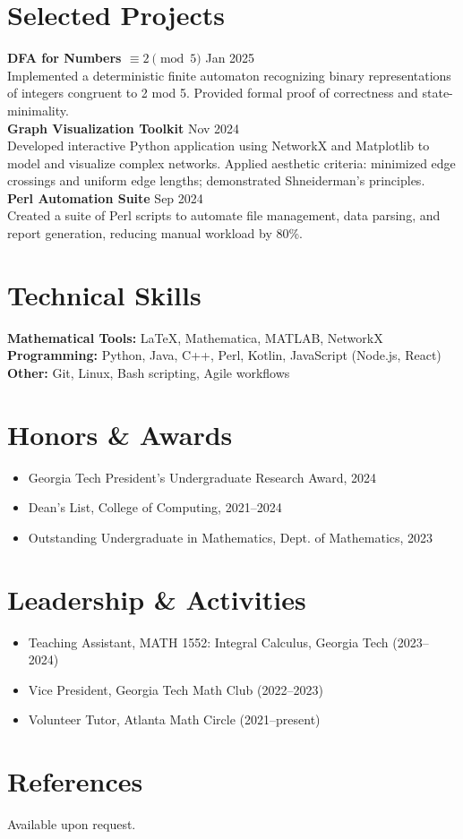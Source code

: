 \section*{Selected Projects}
\noindent
\textbf{DFA for Numbers $\equiv 2 \pmod{5}$} \hfill Jan 2025\\
Implemented a deterministic finite automaton recognizing binary representations of integers congruent to 2 mod 5. Provided formal proof of correctness and state-minimality.\\

\noindent
\textbf{Graph Visualization Toolkit} \hfill Nov 2024\\
Developed interactive Python application using NetworkX and Matplotlib to model and visualize complex networks. Applied aesthetic criteria: minimized edge crossings and uniform edge lengths; demonstrated Shneiderman's principles.\\

\noindent
\textbf{Perl Automation Suite} \hfill Sep 2024\\
Created a suite of Perl scripts to automate file management, data parsing, and report generation, reducing manual workload by 80\%.

\section*{Technical Skills}
\noindent
\textbf{Mathematical Tools:} LaTeX, Mathematica, MATLAB, NetworkX\\
\textbf{Programming:} Python, Java, C++, Perl, Kotlin, JavaScript (Node.js, React)\\
\textbf{Other:} Git, Linux, Bash scripting, Agile workflows

\section*{Honors \& Awards}
\begin{itemize}
  \item Georgia Tech President's Undergraduate Research Award, 2024
  \item Dean's List, College of Computing, 2021--2024
  \item Outstanding Undergraduate in Mathematics, Dept. of Mathematics, 2023
\end{itemize}

\section*{Leadership \& Activities}
\begin{itemize}
  \item Teaching Assistant, MATH 1552: Integral Calculus, Georgia Tech (2023--2024)
  \item Vice President, Georgia Tech Math Club (2022--2023)
  \item Volunteer Tutor, Atlanta Math Circle (2021--present)
\end{itemize}

\section*{References}
Available upon request.